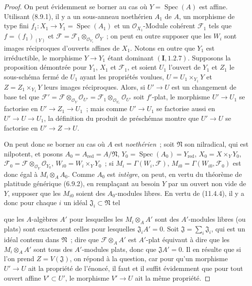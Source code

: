 \begin{proof}
On peut évidemment se borner au cas où $Y=\operatorname{Spec}(A)$ est affine.
Utilisant (8.9.1), il y a un sous-anneau noethérien $A_1$ de $A$, un morphisme
de type fini $f_1:X_1\to Y_1=\operatorname{Spec}(A_1)$ et un
$\mathcal O_{X_1}$-Module cohérent $\mathcal F_1$ tels que $f=(f_1)_{(Y)}$ et
$\mathcal F=\mathcal F_1\otimes_{\mathcal O_{Y_1}}\mathcal O_Y$~; on peut en
outre supposer que les $W_i$ sont images réciproques d'ouverts affines de
$X_1$. Notons en outre que $Y_1$ est irréductible, le morphisme $Y\to Y_1$
étant dominant $(\mathbf I,1.2.7)$. Supposons la proposition démontrée pour
$Y_1$, $X_1$ et $\mathcal F_1$, et soient $U_1$ l'ouvert de $Y_1$ et $Z_1$ le
sous-schéma fermé de $U_1$ ayant les propriétés voulues, $U=U_1\times_{Y_1}Y$
et $Z=Z_1\times_{Y_1}Y$ leurs images réciproques. Alors, si $U'\to U$ est un
changement de base tel que
$\mathcal F'=\mathcal F\otimes_{\mathcal O_Y}\mathcal O_{U'}
=\mathcal F_1\otimes_{\mathcal O_{Y_1}}\mathcal O_{U'}$ soit $f'$-plat, le
morphisme $U'\to U_1$ se factorise en $U'\to Z_1\to U_1$~; mais comme
$U'\to U_1$ se factorise aussi en $U'\to U\to U_1$, la définition du produit
de préschémas montre que $U'\to U$ se factorise en $U'\to Z\to U$.

On peut donc se borner au cas où $A$ est \emph{noethérien}~; soit
$\mathfrak N$ son nilradical, qui est nilpotent, et posons
$A_0=A_{\mathrm{red}}=A/\mathfrak N$,
$Y_0=\operatorname{Spec}(A_0)=Y_{\mathrm{red}}$,
$X_0=X\times_YY_0$, $\mathcal F_0=\mathcal F\otimes_{\mathcal O_Y}
\mathcal O_{Y_0}$, $W_{i0}=W_i\times_YY_0$~; si
$M_i=\Gamma(W_i,\mathcal F)$, $M_{i0}=\Gamma(W_{i0},\mathcal F_0)$ est donc
égal à $M_i\otimes_A A_0$. Comme $A_0$ est \emph{intègre}, on peut, en vertu du
théorème de platitude générique (6.9.2), en remplaçant au besoin $Y$ par un
ouvert non vide de $Y$, supposer que les $M_{i0}$ soient des $A_0$-modules
libres. En vertu de (11.4.4), il y a donc pour chaque $i$ un idéal
$\mathfrak J_i\subset\mathfrak N$ tel


que les $A$-algèbres $A'$ pour lesquelles les $M_i\otimes_A A'$ sont des
$A'$-modules libres (ou plats) sont exactement celles pour lesquelles
$\mathfrak J_iA'=0$. Soit $\mathfrak J=\sum_i\mathfrak J_i$, qui est un idéal
contenu dans $\mathfrak N$~; dire que $\mathcal F\otimes_A A'$ est $A'$-plat
équivaut à dire que les $M_i\otimes_A A'$ sont tous des $A'$-modules plats,
donc que $\mathfrak JA'=0$. Il en résulte que si l'on prend
$Z=V(\mathfrak J)$, on répond à la question, car pour qu'un morphisme
$U'\to U$ ait la propriété de l'énoncé, il faut et il suffit évidemment que
pour tout ouvert affine $V'\subset U'$, le morphisme $V'\to U$ ait la même
propriété.
\end{proof}

